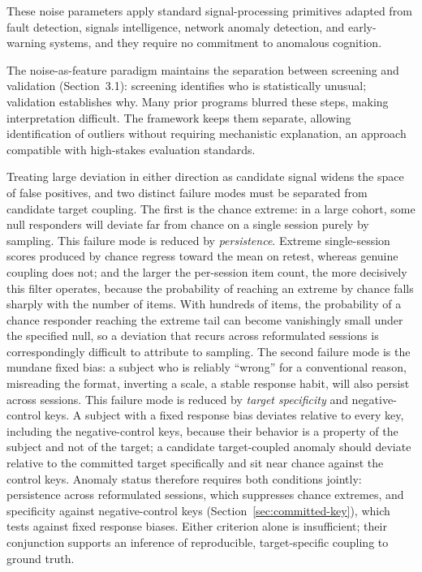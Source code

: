 \documentclass[11pt,letterpaper]{article}
\begin{document}
These noise parameters apply standard signal-processing primitives adapted from fault detection, signals intelligence, network anomaly detection, and early-warning systems, and they require no commitment to anomalous cognition.

The noise-as-feature paradigm maintains the separation between screening and validation (Section~3.1): screening identifies who is statistically unusual; validation establishes why. Many prior programs blurred these steps, making interpretation difficult. The framework keeps them separate, allowing identification of outliers without requiring mechanistic explanation, an approach compatible with high-stakes evaluation standards.

Treating large deviation in either direction as candidate signal widens the space of false positives, and two distinct failure modes must be separated from candidate target coupling. The first is the chance extreme: in a large cohort, some null responders will deviate far from chance on a single session purely by sampling. This failure mode is reduced by \textit{persistence}. Extreme single-session scores produced by chance regress toward the mean on retest, whereas genuine coupling does not; and the larger the per-session item count, the more decisively this filter operates, because the probability of reaching an extreme by chance falls sharply with the number of items. With hundreds of items, the probability of a chance responder reaching the extreme tail can become vanishingly small under the specified null, so a deviation that recurs across reformulated sessions is correspondingly difficult to attribute to sampling. The second failure mode is the mundane fixed bias: a subject who is reliably ``wrong'' for a conventional reason, misreading the format, inverting a scale, a stable response habit, will also persist across sessions. This failure mode is reduced by \textit{target specificity} and negative-control keys. A subject with a fixed response bias deviates relative to every key, including the negative-control keys, because their behavior is a property of the subject and not of the target; a candidate target-coupled anomaly should deviate relative to the committed target specifically and sit near chance against the control keys. Anomaly status therefore requires both conditions jointly: persistence across reformulated sessions, which suppresses chance extremes, and specificity against negative-control keys (Section~\ref{sec:committed-key}), which tests against fixed response biases. Either criterion alone is insufficient; their conjunction supports an inference of reproducible, target-specific coupling to ground truth.
\end{document}
